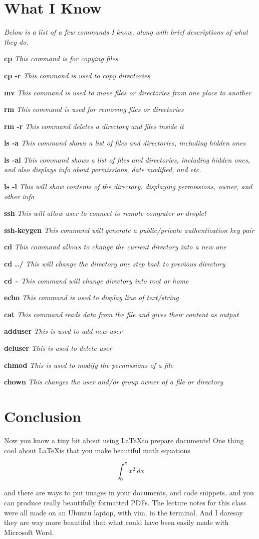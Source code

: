 \documentclass[11pt]{article}
\newcommand{\iknow}[2]{\par\textbf{#1} \textit{#2}}
\begin{document}
\section*{What I Know}

\noindent\textit{Below is a list of a few commands I know, along with brief descriptions of what they do.}
\iknow{cp}{This command is for copying files}
\iknow{cp -r}{This command is used to copy directories}
\iknow{mv}{This command is used to move files or directories from one place to another}
\iknow{rm}{This command is used for removing files or directories}
\iknow{rm -r}{This command deletes a directory and files inside it}
\iknow{ls -a}{This command shows a list of files and directories, including hidden ones}
\iknow{ls -al}{This command shows a list of files and directories, including hidden ones, and also displays info about permissions, date modified, and etc.}
\iknow{ls -l}{This will show contents of the directory, displaying permissions, owner, and other info}
\iknow{ssh}{This will allow user to connect to remote computer or droplet}
\iknow{ssh-keygen}{This command will generate a public/private authentication key pair}
\iknow{cd}{This command allows to change the current directory into a new one}
\iknow{cd ../}{This will change the directory one step back to previous directory}
\iknow{cd \textasciitilde}{This command will change directory into root or home}
\iknow{echo}{This command is used to display line of text/string}
\iknow{cat}{This command reads data from the file and gives their content as output}
\iknow{adduser}{This is used to add new user}
\iknow{deluser}{This is used to delete user}
\iknow{chmod}{This is used to modify the permissions of a file}
\iknow{chown}{This changes the user and/or group owner of a file or directory}

\section*{Conclusion}
Now you know a tiny bit about using \LaTeX to prepare documents! One thing cool about \LaTeX is that you make beautiful math equations

\begin{equation}
\int_{0}^{\pi}x^2\,dx
\end{equation}

and there are ways to put images in your documents, and code snippets, and you can produce really beautifully formatted PDFs. The lecture notes for this class were all made on an Ubuntu laptop, with vim, in the terminal. And I daresay they are way more beautiful that what could have been easily made with Microsoft Word.
\end{document}
